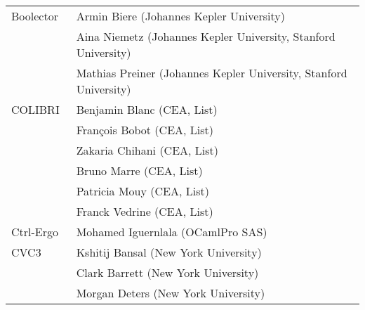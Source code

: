 {\begin{table}
{\begin{tabular}{ll}
      Boolector~\cite{DBLP:conf/cav/NiemetzPWB18}
      & Armin Biere (Johannes Kepler University) \\
      & Aina Niemetz (Johannes Kepler University, Stanford University) \\
      & Mathias Preiner (Johannes Kepler University, Stanford University)
      \\ \midrule

      COLIBRI~\cite{colibri}
      & Benjamin Blanc (CEA, List) \\
      & Fran\c{c}ois Bobot (CEA, List) \\
      & Zakaria Chihani (CEA, List) \\
      & Bruno Marre (CEA, List) \\
      & Patricia Mouy (CEA, List) \\
      & Franck Vedrine (CEA, List)
      \\ \midrule

      Ctrl-Ergo~\cite{10.1007/978-3-642-31365-3_8}
      & Mohamed Iguernlala (OCamlPro SAS)
      \\ \midrule

      CVC3~\cite{DBLP:conf/cav/BarrettT07}
      & Kshitij Bansal (New York University) \\
      & Clark Barrett (New York University) \\
      & Morgan Deters (New York University)
      \\ \bottomrule
    \end{tabular}
    }
  \end{table}


}
